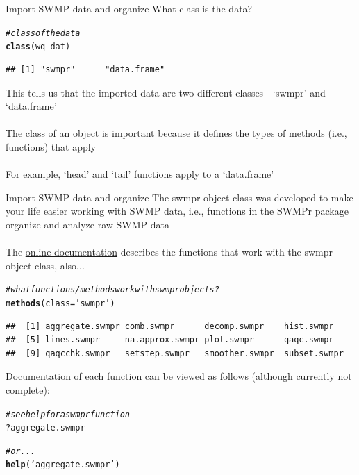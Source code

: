 \documentclass[xcolor=svgnames]{beamer}\usepackage[]{graphicx}\usepackage[]{color}
\makeatletter
\newcommand{\hlstr}[1]{\textcolor[rgb]{0.192,0.494,0.8}{#1}}%
\newcommand{\hlcom}[1]{\textcolor[rgb]{0.678,0.584,0.686}{\textit{#1}}}%
\newcommand{\hlopt}[1]{\textcolor[rgb]{0,0,0}{#1}}%
\newcommand{\hlstd}[1]{\textcolor[rgb]{0.345,0.345,0.345}{#1}}%
\newcommand{\hlkwc}[1]{\textcolor[rgb]{0.333,0.667,0.333}{#1}}%
\newcommand{\hlkwd}[1]{\textcolor[rgb]{0.737,0.353,0.396}{\textbf{#1}}}%
\newenvironment{kframe}{%
 \def\at@end@of@kframe{}%
 \ifinner\ifhmode%
  \def\at@end@of@kframe{\end{minipage}}%
  \begin{minipage}{\columnwidth}%
 \fi\fi%
 \def\FrameCommand##1{\hskip\@totalleftmargin \hskip-\fboxsep
 \colorbox{shadecolor}{##1}\hskip-\fboxsep
     \hskip-\linewidth \hskip-\@totalleftmargin \hskip\columnwidth}%
 \MakeFramed {\advance\hsize-\width
   \@totalleftmargin\z@ \linewidth\hsize
   \@setminipage}}%
 {\par\unskip\endMakeFramed%
 \at@end@of@kframe}
\newenvironment{knitrout}{}{} %
\makeatother
\begin{document}
\begin{frame}{Import SWMP data and organize}
What class is the data?
\begin{knitrout}\scriptsize
{}\color{fgcolor}\begin{kframe}
\begin{alltt}
\hlcom{# class of the data}
\hlkwd{class}\hlstd{(wq_dat)}
\end{alltt}
\begin{verbatim}
## [1] "swmpr"      "data.frame"
\end{verbatim}
\end{kframe}
\end{knitrout}
This tells us that the imported data are two different classes - `swmpr' and `data.frame'\\~\\
The class of an object is important because it defines the types of methods (i.e., functions) that apply\\~\\
For example, `head' and `tail' functions apply to a `data.frame'
\end{frame}

\begin{frame}{Import SWMP data and organize}
The swmpr object class was developed to make your life easier working with SWMP data, i.e., functions in the SWMPr package organize and analyze raw SWMP data\\~\\
The \href{https://github.com/fawda123/SWMPr}{online documentation} describes the functions that work with the swmpr object class, also...
\begin{knitrout}\scriptsize
{}\color{fgcolor}\begin{kframe}
\begin{alltt}
\hlcom{# what functions/methods work with swmpr objects?}
\hlkwd{methods}\hlstd{(}\hlkwc{class} \hlstd{=} \hlstr{'swmpr'}\hlstd{)}
\end{alltt}
\begin{verbatim}
##  [1] aggregate.swmpr comb.swmpr      decomp.swmpr    hist.swmpr     
##  [5] lines.swmpr     na.approx.swmpr plot.swmpr      qaqc.swmpr     
##  [9] qaqcchk.swmpr   setstep.swmpr   smoother.swmpr  subset.swmpr
\end{verbatim}
\end{kframe}
\end{knitrout}
Documentation of each function can be viewed as follows (although currently not complete):
\begin{knitrout}\scriptsize
{}\color{fgcolor}\begin{kframe}
\begin{alltt}
\hlcom{# see help for a swmpr function}
\hlopt{?}\hlstd{aggregate.swmpr}

\hlcom{# or...}
\hlkwd{help}\hlstd{(}\hlstr{'aggregate.swmpr'}\hlstd{)}
\end{alltt}
\end{kframe}
\end{knitrout}
\end{frame}
\end{document}
